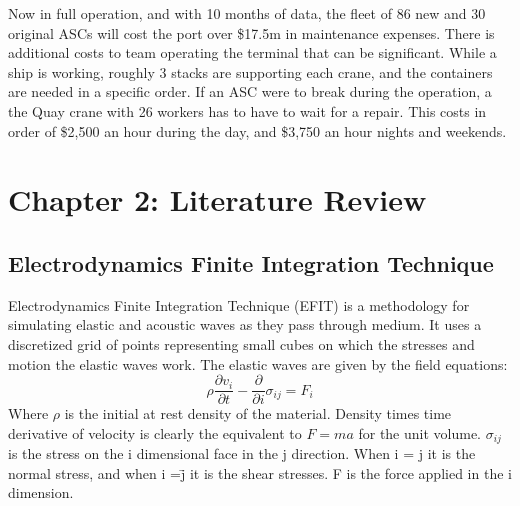 \documentclass[journal=jacsat,manuscript=article]{achemso}
\begin{document}
Now in full operation, and with 10 months of data, the fleet of 86 new and 30 original ASCs will cost the port over \$17.5m in maintenance expenses. There is additional costs to team operating the terminal that can be significant. While a ship is working, roughly 3 stacks are supporting each crane, and the containers are needed in a specific order. If an ASC were to break during the operation, a the Quay crane with 26 workers has to have to wait for a repair. This costs in order of \$2,500 an hour during the day, and \$3,750 an hour nights and weekends.


\pagebreak
\section{Chapter 2: Literature Review}
\subsection{Electrodynamics Finite Integration Technique}
Electrodynamics Finite Integration Technique (EFIT) is a methodology for simulating elastic and acoustic waves as they pass through medium.  It uses a discretized grid of points representing small cubes on which the stresses and motion the elastic waves work.  The elastic waves are given by the field equations:
\begin{equation}
	\rho \frac{\partial v_i}{\partial t} - \frac{\partial}{\partial i}\sigma_{ij} = F_i
\end{equation}
Where $\rho$ is the initial at rest density of the material.  Density times time derivative of velocity is clearly the equivalent to $F=ma$ for the unit volume.  $\sigma_{ij}$ is the stress on the i dimensional face in the j direction.  When i = j it is the normal stress, and when i =\= j it is the shear stresses.  F is the force applied in the i dimension. 
\end{document}
